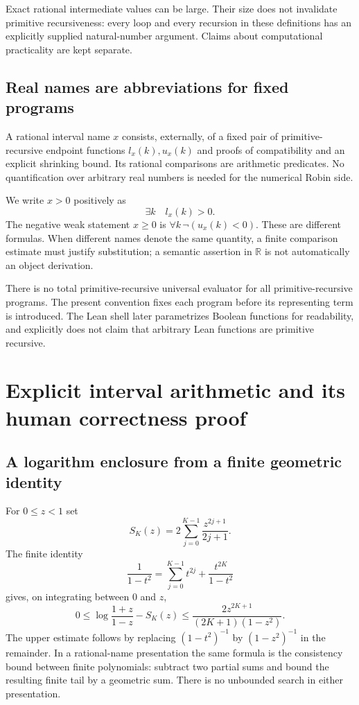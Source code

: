 \documentclass[11pt,a4paper]{article}
\theoremstyle{definition}
\newcommand{\RR}{\mathbb R}
\begin{document}
Exact rational intermediate values can be large. Their size does not
invalidate primitive recursiveness: every loop and every recursion in
these definitions has an explicitly supplied natural-number argument.
Claims about computational practicality are kept separate.

\subsection{Real names are abbreviations for fixed programs}

A rational interval name $x$ consists, externally, of a fixed pair of
primitive-recursive endpoint functions $l_x(k),u_x(k)$ and proofs of
compatibility and an explicit shrinking bound. Its rational comparisons
are arithmetic predicates. No quantification over arbitrary real
numbers is needed for the numerical Robin side.

We write $x>0$ positively as
\[
 \exists k\quad l_x(k)>0.
\]
The negative weak statement $x\ge0$ is
$\forall k\,\neg(u_x(k)<0)$. These are different formulas.
When different names denote the same quantity, a finite comparison
estimate must justify substitution; a semantic assertion in $\RR$ is
not automatically an object derivation.

There is no total primitive-recursive universal evaluator for all
primitive-recursive programs. The present convention fixes each program
before its representing term is introduced. The Lean shell later
parametrizes Boolean functions for readability, and explicitly does not
claim that arbitrary Lean functions are primitive recursive.

\section{Explicit interval arithmetic and its human correctness proof}
\label{sec:intervals}

\subsection{A logarithm enclosure from a finite geometric identity}

For $0\le z<1$ set
\[
 S_K(z)=2\sum_{j=0}^{K-1}\frac{z^{2j+1}}{2j+1}.
\]
The finite identity
\[
 \frac1{1-t^2}=\sum_{j=0}^{K-1}t^{2j}
                   +\frac{t^{2K}}{1-t^2}
\]
gives, on integrating between $0$ and $z$,
\begin{equation}\label{eq:logtail}
 0\le
 \log\frac{1+z}{1-z}-S_K(z)
 \le\frac{2z^{2K+1}}{(2K+1)(1-z^2)}.
\end{equation}
The upper estimate follows by replacing $(1-t^2)^{-1}$ by
$(1-z^2)^{-1}$ in the remainder. In a rational-name presentation the same
formula is the consistency bound between finite polynomials: subtract two
partial sums and bound the resulting finite tail by a geometric sum.
There is no unbounded search in either presentation.
\end{document}
